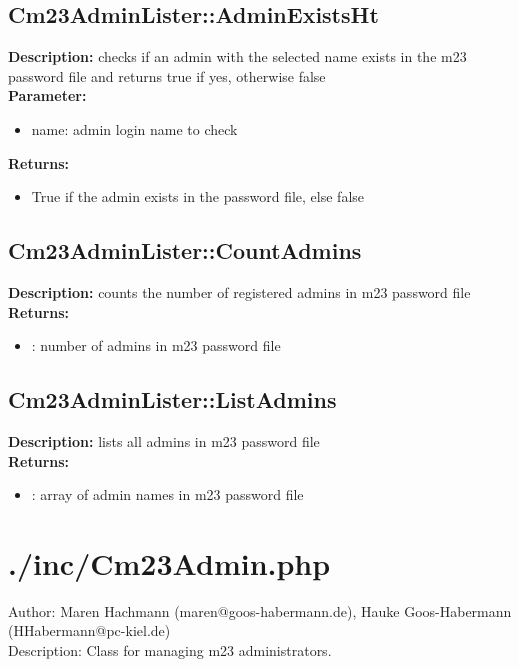 \subsection{Cm23AdminLister::AdminExistsHt}
\textbf{Description:} checks if an admin with the selected name exists in the m23 password file and returns true if yes, otherwise false\\
\textbf{Parameter:}
\begin{itemize}
\item name: admin login name to check
\end{itemize}
\textbf{Returns:}
\begin{itemize}
\item True if the admin exists in the password file, else false
\end{itemize}

\subsection{Cm23AdminLister::CountAdmins}
\textbf{Description:} counts the number of registered admins in m23 password file\\
\textbf{Returns:}
\begin{itemize}
\item : number of admins in m23 password file
\end{itemize}

\subsection{Cm23AdminLister::ListAdmins}
\textbf{Description:} lists all admins in m23 password file\\
\textbf{Returns:}
\begin{itemize}
\item : array of admin names in m23 password file
\end{itemize}

\newpage\section{./inc/Cm23Admin.php}
 Author: Maren Hachmann (maren@goos-habermann.de), Hauke Goos-Habermann (HHabermann@pc-kiel.de)\\
 Description: Class for managing m23 administrators.\\

